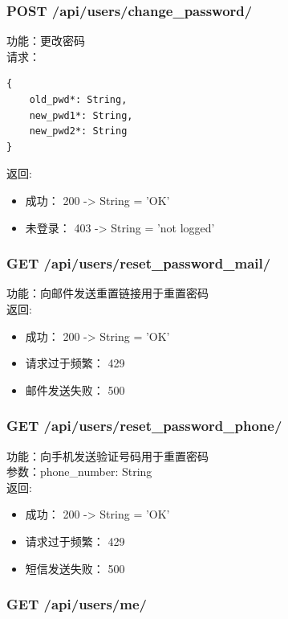 \subsubsection{POST /api/users/change\_password/}

\noindent
功能：更改密码\\
请求：
\begin{lstlisting}[numbers=none, frame=none]
{
    old_pwd*: String,
    new_pwd1*: String,
    new_pwd2*: String
}
\end{lstlisting}
返回:
\begin{itemize}
	\item 成功： 200 -> String = 'OK'
	\item 未登录： 403 -> String = 'not logged'
\end{itemize}

\subsubsection{GET /api/users/reset\_password\_mail/}

\noindent
功能：向邮件发送重置链接用于重置密码\\
返回:
\begin{itemize}
	\item 成功： 200 -> String = 'OK'
	\item 请求过于频繁： 429
	\item 邮件发送失败： 500
\end{itemize}


\subsubsection{GET /api/users/reset\_password\_phone/}

\noindent
功能：向手机发送验证号码用于重置密码\\
参数：phone\_number: String\\
返回:
\begin{itemize}
\item 成功： 200 -> String = 'OK'
\item 请求过于频繁： 429
\item 短信发送失败： 500
\end{itemize}



\subsubsection{GET /api/users/me/}

